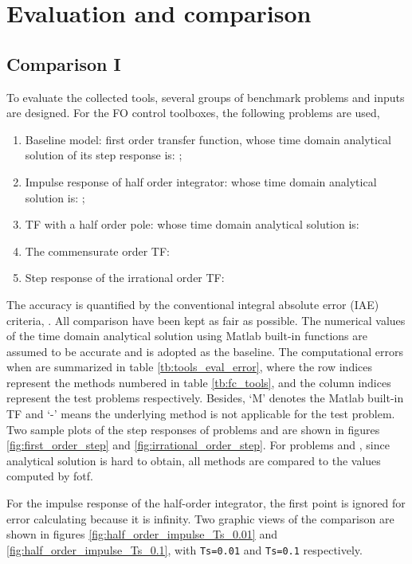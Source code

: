 \documentclass[11pt]{tCON2e}
\theoremstyle{plain}\newtheorem{theorem}{Theorem}
\theoremstyle{definition}
\theoremstyle{remark}
\begin{document}
\section{Evaluation and comparison}
\label{sec:evaluation}
\subsection{Comparison I}
To evaluate the collected tools, several groups of benchmark problems and inputs are designed. For the FO control toolboxes, the following problems are used,
\begin{enumerate}
    \item Baseline model: first order transfer function,  
    whose time domain analytical solution of its step response is: ;
    \item Impulse response of half order integrator: 
    whose time domain analytical solution is: ;
    \item TF with a half order pole: 
    whose time domain analytical solution is: 
    \item The commensurate order TF: 
    \item Step response of the irrational order TF: 
\end{enumerate}





The accuracy is quantified by the conventional integral absolute error (IAE) criteria, . All comparison have been kept as fair as possible. The numerical values of the time domain analytical solution using Matlab built-in functions are assumed to be accurate and is adopted as the baseline. The computational errors when  are summarized in table \ref{tb:tools_eval_error},
where the row indices represent the methods numbered in table \ref{tb:fc_tools}, and the column indices represent the test problems respectively. Besides, `M' denotes the Matlab built-in TF and `-' means the underlying method is not applicable for the test problem. Two sample plots of the step responses of problems  and  are shown in figures \ref{fig:first_order_step} and \ref{fig:irrational_order_step}. For problems  and , since analytical solution is hard to obtain, all methods are compared to the values computed by fotf.



For the impulse response of the half-order integrator, the first point is ignored for error calculating because it is infinity. Two graphic views of the comparison are shown in figures \ref{fig:half_order_impulse_Ts_0.01} and \ref{fig:half_order_impulse_Ts_0.1}, with {\tt Ts=0.01} and {\tt Ts=0.1} respectively.
\end{document}

